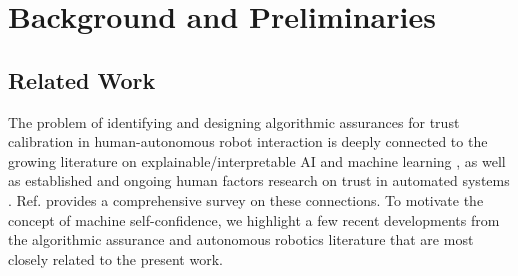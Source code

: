 \section{Background and Preliminaries} \label{sec:background}

\subsection{Related Work}
The problem of identifying and designing algorithmic assurances for trust calibration in human-autonomous robot interaction is deeply connected to the growing literature on explainable/interpretable AI and machine learning , as well as established and ongoing human factors research on trust in automated systems . 
Ref. \cite{Israelsen2018-qz} provides a comprehensive survey on these connections. 
To motivate the concept of machine self-confidence, we highlight a few recent developments from the algorithmic assurance and autonomous robotics literature that are most closely related to the present work. 

